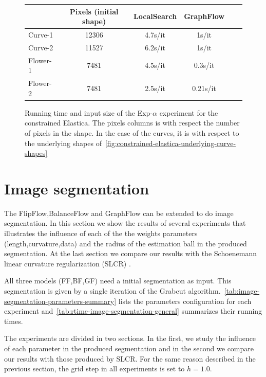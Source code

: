 \begin{figure}
\center
\captionsetup{type=table}
\begin{tabular}{|l|c|c|c|c|c|}
\hline
& Pixels (initial shape) & LocalSearch & GraphFlow \\
\hline
Curve-1 & 12306 & 4.7s/it & 1s/it\\
Curve-2 & 11527 & 6.2s/it & 1s/it\\
Flower-1  & 7481 & 4.5s/it & 0.3s/it \\
Flower-2 & 7481 & 2.5s/it & 0.21s/it\\
\hline
\end{tabular}
\caption{Running time and input size of the Exp-$\alpha$ experiment for the constrained Elastica. The pixels columns is with respect the number of pixels in the shape. In the case of the curves, it is with respect to the underlying shapes of~\cref{fig:constrained-elastica-underlying-curve-shapes}}
\label{tab:rtime-constrained-elastica-general} 
\end{figure}


\section{Image segmentation}

The FlipFlow,BalanceFlow and GraphFlow can be extended to do image segmentation. In this section we show the results of several experiments that illustrates the influence of each of the the weights parameters (length,curvature,data) and the radius of the estimation ball in the produced segmentation. At the last section we compare our results with the Schoenemann linear curvature regularization (SLCR) \cite{schoenemann09linear}. 

All three models (FF,BF,GF) need a initial segmentation as input. This segmentation is given by a single iteration of the Grabcut algorithm.~\cref{tab:image-segmentation-parameters-summary} lists the parameters configuration for each experiment and~\cref{tab:rtime-image-segmentation-general} summarizes their running times. 

The experiments are divided in two sections. In the first, we study the influence of each parameter in the produced segmentation and in the second we compare our results with those produced by SLCR. For the same reason described in the previous section, the grid step in all experiments is set to $h=1.0$.


